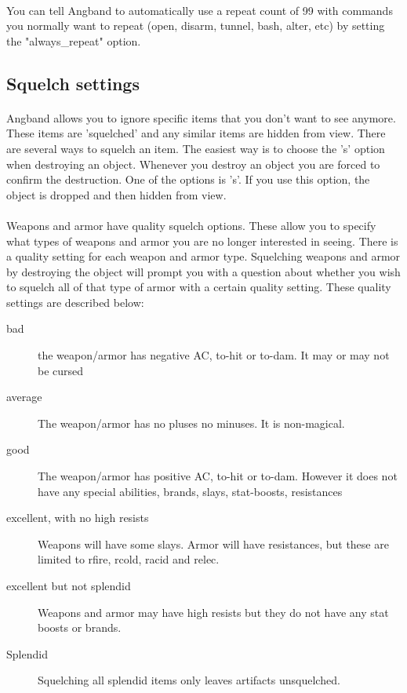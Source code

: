 \paragraph{}You can tell Angband to automatically use a repeat count of 99
with commands you normally want to repeat (open, disarm, tunnel, bash,
alter, etc) by setting the "always\_repeat" option.

\subsection{Squelch settings}
\paragraph{}Angband allows you to ignore specific items that you don't want
to see anymore. These items are 'squelched' and any similar items are
hidden from view. There are several ways to squelch an item. The easiest
way is to choose the 's' option when destroying an object. Whenever you
destroy an object you are forced to confirm the destruction. One of the
options is 's'. If you use this option, the object is dropped and then
hidden from view.

\paragraph{}Weapons and armor have quality squelch options. These allow you
to specify what types of weapons and armor you are no longer interested
in seeing. There is a quality setting for each weapon and armor type.
Squelching weapons and armor by destroying the object will prompt you with
a question about whether you wish to squelch all of that type of armor with
a certain quality setting. These quality settings are described below:
\begin{description} 
\item[bad] the weapon/armor has negative AC, to-hit
    or to-dam. It may or may not be cursed

\item[average] The weapon/armor has no pluses no minuses. It is
    non-magical.

\item[good] The weapon/armor has positive AC, to-hit or to-dam. However
    it does not have any special abilities, brands, slays, stat-boosts,
    resistances
 
\item[excellent, with no high resists] Weapons will have some slays.
    Armor will have resistances, but these are limited to rfire, rcold,
    racid and relec.

\item[excellent but not splendid] Weapons and armor may have high
    resists but they do not have any stat boosts or brands.

\item[Splendid] Squelching all splendid items only leaves artifacts
    unsquelched.  
\end{description}


